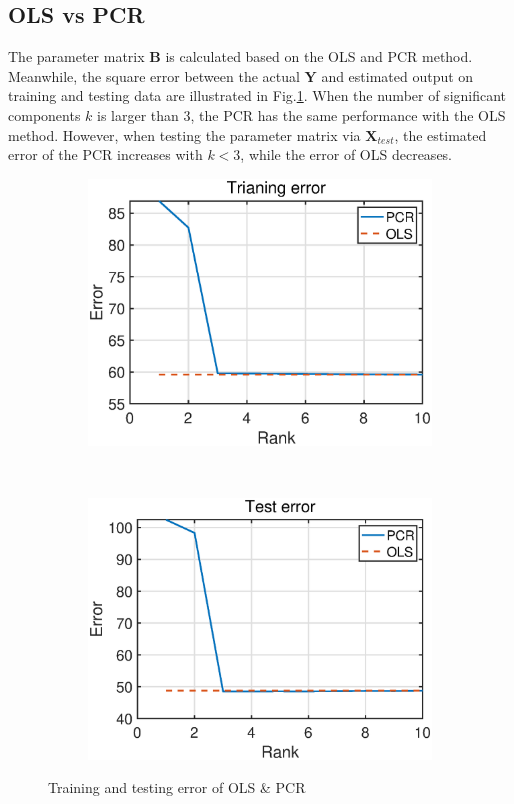 \subsection{OLS vs PCR}
The parameter matrix $\mathbf B$ is calculated based on the OLS and PCR method. Meanwhile, the square error between the actual $\mathbf Y$ and estimated output on training and testing data are illustrated in Fig.\ref{fig:1_6_c}. When the number of significant components $k$ is larger than 3, the PCR has the same performance with the OLS method. However, when testing the parameter matrix via $\mathbf X_{test}$, the estimated error of the PCR increases with $k<3$, while the error of OLS decreases.
\begin{figure}[htbp]
     \centering
     \begin{subfigure}{0.4\textwidth}
         \centering
         \includegraphics[width=\textwidth]{fig/16/16c1.eps}
     \end{subfigure}
     ~
     \begin{subfigure}{0.4\textwidth}
         \centering
         \includegraphics[width=\textwidth]{fig/16/16c2.eps}
     \end{subfigure}
        \caption{Training and testing error of OLS \& PCR}
        \label{fig:1_6_c}
\end{figure}
